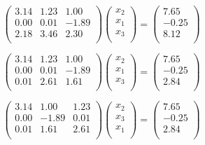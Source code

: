 \documentclass[11pt,a4paper,oneside]{article}
\begin{document}
$$ \left(\begin{matrix}
3.14 & 1.23 & 1.00 \\
0.00 & 0.01 & -1.89 \\
2.18 & 3.46 & 2.30 \\
\end{matrix}\right)
\left(\begin{matrix}
x_2 \\
x_1 \\
x_3 \\
\end{matrix}\right)
=
\left(\begin{matrix}
7.65 \\
-0.25 \\
8.12 \\
\end{matrix}\right) $$

$$ \left(\begin{matrix}
3.14 & 1.23 & 1.00 \\
0.00 & 0.01 & -1.89 \\
0.01 & 2.61 & 1.61 \\
\end{matrix}\right)
\left(\begin
{matrix}
x_2 \\
x_1 \\
x_3 \\
\end{matrix}\right)
=
\left(\begin{matrix}
7.65 \\
-0.25 \\
2.84 \\
\end{matrix}\right) $$

$$ \left(\begin{matrix}
3.14 & 1.00 & 1.23 \\
0.00 & -1.89 & 0.01 \\
0.01 & 1.61 & 2.61 \\
\end{matrix}\right)
\left(\begin{matrix}
x_2 \\
x_3 \\
x_1 \\
\end{matrix}\right)
=
\left(\begin{matrix}
7.65 \\
-0.25 \\
2.84 \\
\end{matrix}\right) $$
\end{document}
